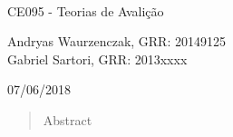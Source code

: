 \begin{titlepage}
\\

\vspace{7.5cm}


\vspace{3cm}

CE095 - Teorias de Avalição

\vspace{2cm}

Andryas Waurzenczak, GRR: 20149125 \\
Gabriel Sartori, GRR: 2013xxxx


\vfill

07/06/2018
\end{titlepage}


\begin{abstract}
Abstract
\end{abstract}


\pagebreak
\tableofcontents
\pagebreak
